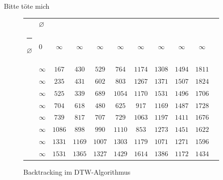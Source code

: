 \documentclass{whswinvcbook}
\makeatletter
\newcommand{\thickhline}{%
    \noalign {\ifnum 0=`}\fi \hrule height 1pt
    \futurelet \reserved@a \@xhline
}
\makeatother
\begin{document}
Bitte töte mich
\begin{figure}[H]
    \begin{center}
        \begin{tabular}{|cTc|c|c|c|c|c|c|c|c|}
            \hline
             & $\varnothing$ &  &  &  &  &  &  &  & \\\thickhline
            $\varnothing$ & 0 & $\infty$ & $\infty$ & $\infty$ & $\infty$ & $\infty$ & $\infty$ & $\infty$ & $\infty$\\\hline
             & $\infty$ & $167$ & $430$ & $529$ & $764$ & $1174$ & $1308$ & $1494$ & $1811$\\\hline
             & $\infty$ & $235$ & $431$ & $602$ & $803$ & $1267$ & $1371$ & $1507$ & $1824$\\\hline
             & $\infty$ & $525$ & $339$ & $689$ & $1054$ & $1170$ & $1531$ & $1496$ & $1706$\\\hline
             & $\infty$ & $704$ & $618$ & $480$ & $625$ & $917$ & $1169$ & $1487$ & $1728$\\\hline
             & $\infty$ & $739$ & $817$ & $707$ & $729$ & $1063$ & $1197$ & $1411$ & $1676$\\\hline
             & $\infty$ & $1086$ & $898$ & $990$ & $1110$ & $853$ & $1273$ & $1451$ & $1622$\\\hline
             & $\infty$ & $1331$ & $1169$ & $1007$ & $1303$ & $1179$ & $1071$ & $1271$ & $1596$\\\hline
             & $\infty$ & $1531$ & $1365$ & $1327$ & $1429$ & $1614$ & $1386$ & $1172$ & $1434$\\\hline
        \end{tabular}
    \end{center}
    \caption{Backtracking im DTW-Algorithmus}
    \label{fig-levenshtein-backtracking}
\end{figure}
\end{document}
